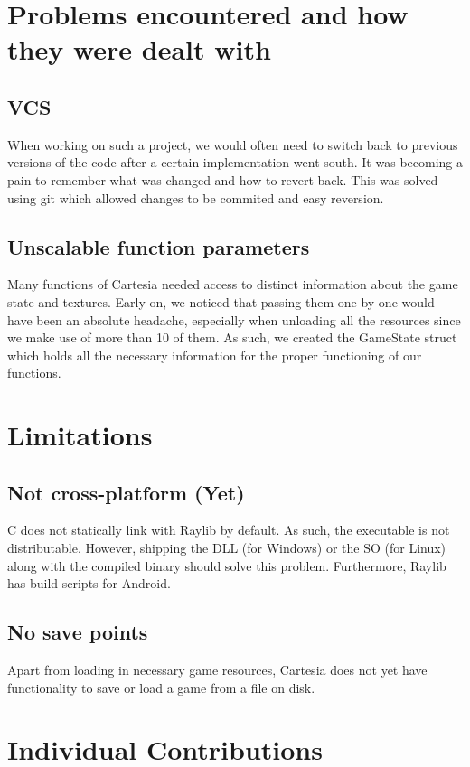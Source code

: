 \documentclass{article}
\begin{document}
\section{Problems encountered and how they were dealt with}
\subsection{VCS}
When working on such a project, we would often need to switch back to previous versions of
the code after a certain implementation went south. It was becoming a pain to remember what 
was changed and how to revert back. This was solved using git which allowed changes to be commited 
and easy reversion.

\subsection{Unscalable function parameters}
Many functions of Cartesia needed access to distinct information about the game state and 
textures. Early on, we noticed that passing them one by one would have been an absolute
headache, especially when unloading all the resources since we make use of more than 10 of them. 
As such, we created the GameState struct which holds all the necessary information for the proper
functioning of our functions.

\section{Limitations}
\subsection{Not cross-platform (Yet)}
C does not statically link with Raylib by default. As such, the executable is not distributable.
However, shipping the DLL (for Windows) or the SO (for Linux) along with the compiled binary 
should solve this problem. Furthermore, Raylib has build scripts for Android.

\subsection{No save points}
Apart from loading in necessary game resources, Cartesia does not yet have functionality to
save or load a game from a file on disk.

\section{Individual Contributions}
\end{document}
